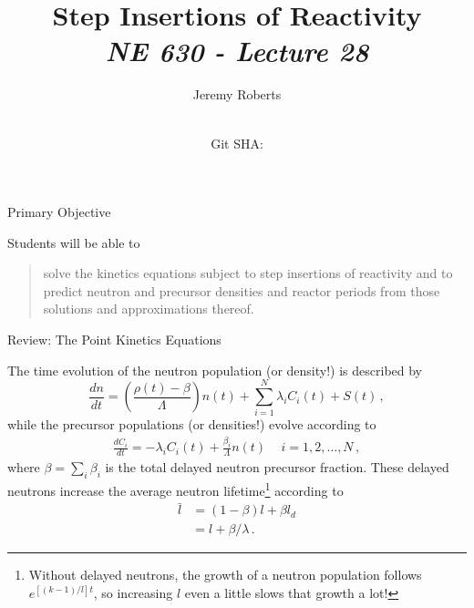 \documentclass[aspectratio=1610]{beamer}
\title{Step Insertions of Reactivity \\
       {\small\it NE 630 - Lecture 28}}
\date{ \\ {\footnotesize Git SHA: }}
\author{Jeremy Roberts}
\begin{document}
\begin{frame}
\titlepage
\end{frame}
 
 
\begin{frame}{Primary Objective}

Students will be able to 

\vfill

\begin{quote}
\textcolor{wcprimary}{solve the kinetics equations subject to step insertions of reactivity and to predict neutron and precursor densities and reactor periods from those solutions and approximations thereof. 
}
\end{quote}

\vfill 

\end{frame}

\begin{frame}[fragile]{Review: The Point Kinetics Equations}

The time evolution of the neutron population (or density!) is described by
\begin{equation*}
  \tag{FNRP 5.47}
  \frac{dn}{dt} = 
     \left ( \frac{\rho(t) - \beta}{\Lambda} \right ) n(t) + 
     \sum^N_{i=1} \lambda_i C_i (t) + S(t) \, ,
\end{equation*}
while the precursor populations (or densities!) evolve according to
\begin{align*}
  \tag{FNRP 5.48}
  \frac{d C_i}{dt} = -\lambda_i C_i(t) + \frac{\beta_i}{\Lambda} n(t) \, \quad i = 1, 2, \ldots, N \, ,
\end{align*}
where $\beta = \sum_i \beta_i$ is the total delayed neutron precursor fraction.  
These delayed neutrons increase the average neutron lifetime\footnote{Without delayed neutrons, the growth of a neutron population follows $e^{[(k-1)/l]t}$, so increasing $l$ even a little slows that growth a lot!} according to
\begin{align*}
\tag{FNRP 5.36}
 \bar{l} &= (1-\beta)l + \beta l_d \\
         &= l + \beta/\lambda \, .
\end{align*}

\end{frame}

 
\end{document}

